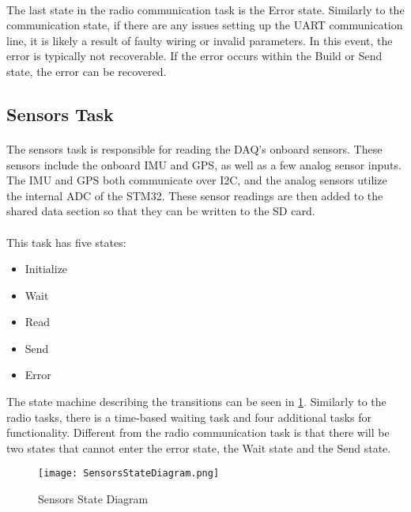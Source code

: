 \paragraph{}
The last state in the radio communication task is the Error state.
Similarly to the communication state, if there are any issues setting up the UART communication line, it is likely a result of faulty wiring or invalid parameters.
In this event, the error is typically not recoverable.
If the error occurs within the Build or Send state, the error can be recovered.


\subsection{Sensors Task}

\paragraph{}
The sensors task is responsible for reading the DAQ's onboard sensors.
These sensors include the onboard IMU and GPS, as well as a few analog sensor inputs.
The IMU and GPS both communicate over I2C, and the analog sensors utilize the internal ADC of the STM32.
These sensor readings are then added to the shared data section so that they can be written to the SD card.

\paragraph{}
This task has five states:
\begin{itemize}
	\item Initialize
	\item Wait
	\item Read
	\item Send
	\item Error
\end{itemize}
The state machine describing the transitions can be seen in \cref{fig:SensorsDiagram}.
Similarly to the radio tasks, there is a time-based waiting task and four additional tasks for functionality.
Different from the radio communication task is that there will be two states that cannot enter the error state, the Wait state and the Send state.

\begin{figure}[H]
	\centering
	\texttt{[image: SensorsStateDiagram.png]}
	\caption{Sensors State Diagram}
	\label{fig:SensorsDiagram}
\end{figure}

